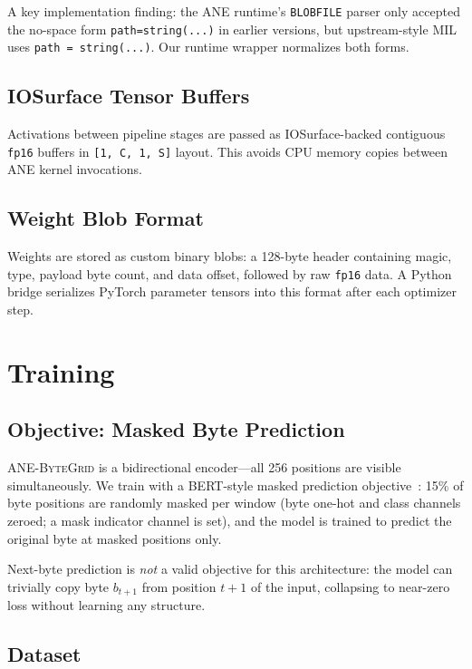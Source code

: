 \documentclass[10pt,twocolumn]{article}
\newcommand{\bytegrid}{\textsc{ANE-ByteGrid}}
\begin{document}
A key implementation finding: the ANE runtime's \texttt{BLOBFILE} parser
only accepted the no-space form \texttt{path=string(...)} in earlier
versions, but upstream-style MIL uses \texttt{path = string(...)}.
Our runtime wrapper normalizes both forms.

\subsection{IOSurface Tensor Buffers}

Activations between pipeline stages are passed as IOSurface-backed
contiguous \texttt{fp16} buffers in \texttt{[1,\,C,\,1,\,S]} layout.
This avoids CPU memory copies between ANE kernel invocations.

\subsection{Weight Blob Format}

Weights are stored as custom binary blobs: a 128-byte header containing
magic, type, payload byte count, and data offset, followed by raw
\texttt{fp16} data.
A Python bridge serializes PyTorch parameter tensors into this format
after each optimizer step.

\section{Training}
\label{sec:training}

\subsection{Objective: Masked Byte Prediction}

\bytegrid{} is a bidirectional encoder---all 256 positions are visible
simultaneously.
We train with a BERT-style masked prediction objective~\cite{TODO_devlin_bert}:
15\% of byte positions are randomly masked per window (byte one-hot and
class channels zeroed; a mask indicator channel is set), and the model is
trained to predict the original byte at masked positions only.

Next-byte prediction is \emph{not} a valid objective for this architecture:
the model can trivially copy byte $b_{t+1}$ from position $t{+}1$ of the
input, collapsing to near-zero loss without learning any structure.

\subsection{Dataset}
\end{document}
